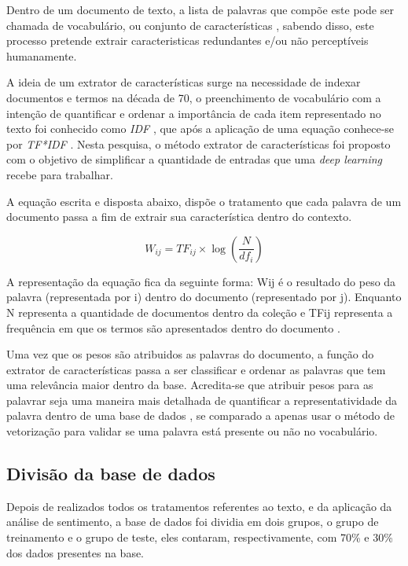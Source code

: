 \documentclass[12pt]{article}
\begin{document}
Dentro de um documento de texto, a lista de palavras que compõe este pode ser chamada de vocabulário, ou conjunto de características \cite{ikonomakis:05}, sabendo disso, este processo pretende extrair caracteristicas redundantes e/ou não perceptíveis humanamente.

A ideia de um extrator de características surge na necessidade de indexar documentos e termos na década de 70, o preenchimento de vocabulário com a intenção de quantificar e ordenar a importância de cada item representado no texto foi conhecido como \emph{IDF} \cite{jones:72}, que após a aplicação de uma equação conhece-se por \emph{TF*IDF} \cite{zhang:11}. Nesta pesquisa, o método extrator de características foi proposto com o objetivo de simplificar a quantidade de entradas que uma \emph{deep learning} recebe para trabalhar.

A equação escrita e disposta abaixo, dispõe o tratamento que cada palavra de um documento passa a fim de extrair sua característica dentro do contexto. 

\begin{equation}
W_{ij} = TF_{ij} \times \log \left ( \frac{N}{df_{i}} \right )
\end{equation}

A representação da equação fica da seguinte forma: Wij é o resultado do peso da palavra (representada por i) dentro do documento (representado por j). Enquanto N representa a quantidade de documentos dentro da coleção e TFij representa a frequência em que os termos são apresentados dentro do documento \cite{zhang:11}.

Uma vez que os pesos são atribuidos as palavras do documento, a função do extrator de características passa a ser classificar e ordenar as palavras que tem uma relevância maior dentro da base. Acredita-se que atribuir pesos para as palavrar seja uma maneira mais detalhada de quantificar a representatividade da palavra dentro de uma base de dados \cite{robertson:06}, se comparado a apenas usar o método de vetorização para validar se uma palavra está presente ou não no vocabulário.

\subsection{Divisão da base de dados}\label{sec:proccess}

Depois de realizados todos os tratamentos referentes ao texto, e da aplicação da análise de sentimento, a base de dados foi dividia em dois grupos, o grupo de treinamento e o grupo de teste, eles contaram, respectivamente, com 70\% e 30\% dos dados presentes na base.
\end{document}
